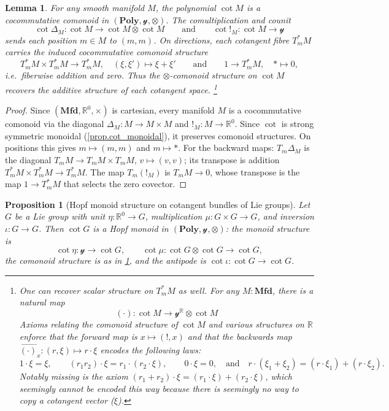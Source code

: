 \documentclass[11pt, oneside, article]{memoir}
\theoremstyle{definition}
\theoremstyle{plain}
\newtheorem{proposition}[proposition]{Proposition}
\newtheorem{lemma}[lemma]{Lemma}
\newcommand{\Cat}[1]{\mathbf{#1}}%
\newcommand{\bk}[1]{\overset{\scriptscriptstyle\leftarrow}{#1}}
\newcommand{\rr}{\mathbb{R}}
\newcommand{\yon}{\mathcal{y}}
\newcommand{\poly}{\Cat{Poly}}
\newcommand{\qand}{\quad\text{and}\quad}
\newcommand{\qqand}{\qquad\text{and}\qquad}
\newcommand{\mfd}{\Cat{Mfd}}
\begin{document}
\begin{lemma}\label{lem.cot_comonoid}
For any smooth manifold $M$, the polynomial $\cot{M}$ is a cocommutative comonoid in $(\poly,\yon,\otimes)$. The comultiplication and counit
\[
\cot{\Delta_M}\colon\cot{M}\to\cot{M}\otimes\cot{M}
\qqand
 \cot{!_M}\colon\cot{M}\to\yon
\]
sends each position $m\in M$ to $(m,m)$. On directions, each cotangent fibre $T^*_mM$ carries the induced cocommutative comonoid structure
\[
T^*_mM\times T^*_mM\to T^*_mM,\quad (\xi,\xi')\mapsto\xi+\xi'
\qqand 1\to T^*_mM,\quad *\mapsto 0,
\]
i.e.\ fiberwise addition and zero. Thus the $\otimes$-comonoid structure on $\cot{M}$ recovers the additive structure of each cotangent space.%
\footnote{
One can recover scalar structure on $T^*_mM$ as well. For any $M:\mfd$, there is a natural map
\[
(\cdot)\colon\cot{M}\to\yon^\rr\otimes\cot{M}
\]
Axioms relating the comonoid structure of $\cot{M}$ and various structures on $\rr$ enforce that the forward map is $x\mapsto (!,x)$ and that the backwards map $\bk{(\cdot)}_x\colon (r,\xi)\mapsto r\cdot\xi$ encodes the following laws:
\[
	1\cdot\xi=\xi,\qquad
	(r_1r_2)\cdot\xi=r_1\cdot(r_2\cdot\xi),\qquad
	0\cdot\xi=0,\qand
	r\cdot(\xi_1+\xi_2)=(r\cdot\xi_1)+(r\cdot\xi_2).
\]
Notably missing is the axiom $(r_1+r_2)\cdot\xi=(r_1\cdot\xi)+(r_2\cdot\xi)$, which seemingly cannot be encoded this way because there is seemingly no way to copy a cotangent vector ($\xi$).
}
\end{lemma}

\begin{proof}
Since $(\mfd,\mathbb{R}^0,\times)$ is cartesian, every manifold $M$ is a cocommutative comonoid via the diagonal $\Delta_M\colon M\to M\times M$ and $!_M\colon M\to\mathbb{R}^0$. Since $\cot$ is strong symmetric monoidal (\cref{prop.cot_monoidal}), it preserves comonoid structures. On positions this gives $m\mapsto(m,m)$ and $m\mapsto *$. For the backward maps: $T_m\Delta_M$ is the diagonal $T_mM\to T_mM\times T_mM$, $v\mapsto(v,v)$; its transpose is addition $T^*_mM\times T^*_mM\to T^*_mM$. The map $T_m(!_M)$ is $T_mM\to 0$, whose transpose is the map $1\to T^*_mM$ that selects the zero covector.
\end{proof}


\begin{proposition}[Hopf monoid structure on cotangent bundles of Lie groups]\label{prop.cot_hopf}
Let $G$ be a Lie group with unit $\eta\colon\mathbb{R}^0\to G$, multiplication $\mu\colon G\times G\to G$, and inversion $\iota\colon G\to G$. Then $\cot{G}$ is a Hopf monoid in $(\poly,\yon,\otimes)$: the monoid structure is
\[
\cot{\eta}\colon\yon\to\cot{G},\qquad \cot{\mu}\colon\cot{G}\otimes\cot{G}\to\cot{G},
\]
the comonoid structure is as in \cref{lem.cot_comonoid}, and the antipode is $\cot{\iota}\colon\cot{G}\to\cot{G}$.
\end{proposition}
\end{document}
